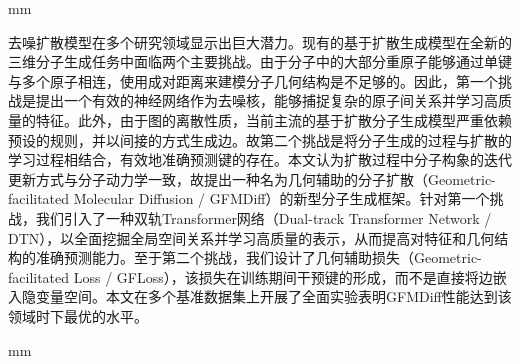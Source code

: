 \frontmatter
{}
\cfoot{\thepage}
\newpage
\begin{center}
\heiti{}
\end{center}
 mm
\begin{spacing}{1.5}
{\sihao 去噪扩散模型在多个研究领域显示出巨大潜力。现有的基于扩散生成模型在全新的三维分子生成任务中面临两个主要挑战。由于分子中的大部分重原子能够通过单键与多个原子相连，使用成对距离来建模分子几何结构是不足够的。因此，第一个挑战是提出一个有效的神经网络作为去噪核，能够捕捉复杂的原子间关系并学习高质量的特征。此外，由于图的离散性质，当前主流的基于扩散分子生成模型严重依赖预设的规则，并以间接的方式生成边。故第二个挑战是将分子生成的过程与扩散的学习过程相结合，有效地准确预测键的存在。本文认为扩散过程中分子构象的迭代更新方式与分子动力学一致，故提出一种名为几何辅助的分子扩散（Geometric-facilitated Molecular Diffusion / GFMDiff）的新型分子生成框架。针对第一个挑战，我们引入了一种双轨Transformer网络（Dual-track Transformer Network / DTN），以全面挖掘全局空间关系并学习高质量的表示，从而提高对特征和几何结构的准确预测能力。至于第二个挑战，我们设计了几何辅助损失（Geometric-facilitated Loss / GFLoss），该损失在训练期间干预键的形成，而不是直接将边嵌入隐变量空间。本文在多个基准数据集上开展了全面实验表明GFMDiff性能达到该领域时下最优的水平。}
\end{spacing}
 mm



